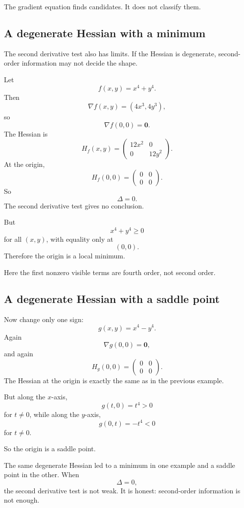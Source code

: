 The gradient equation finds candidates.  It does not classify them.

\subsection{A degenerate Hessian with a minimum}

The second derivative test also has limits.  If the Hessian is degenerate, second-order
information may not decide the shape.

Let
\[
    f(x,y)=x^4+y^4.
\]
Then
\[
    \nabla f(x,y)=(4x^3,4y^3),
\]
so
\[
    \nabla f(0,0)=\mathbf 0.
\]
The Hessian is
\[
    H_f(x,y)
    =
    \begin{pmatrix}
        12x^2 & 0\\
        0 & 12y^2
    \end{pmatrix}.
\]
At the origin,
\[
    H_f(0,0)
    =
    \begin{pmatrix}
        0&0\\
        0&0
    \end{pmatrix}.
\]
So
\[
    \Delta=0.
\]
The second derivative test gives no conclusion.

But
\[
    x^4+y^4\ge0
\]
for all \((x,y)\), with equality only at
\[
    (0,0).
\]
Therefore the origin is a local minimum.

Here the first nonzero visible terms are fourth order, not second order.

\subsection{A degenerate Hessian with a saddle point}

Now change only one sign:
\[
    g(x,y)=x^4-y^4.
\]
Again
\[
    \nabla g(0,0)=\mathbf 0,
\]
and again
\[
    H_g(0,0)
    =
    \begin{pmatrix}
        0&0\\
        0&0
    \end{pmatrix}.
\]
The Hessian at the origin is exactly the same as in the previous example.

But along the \(x\)-axis,
\[
    g(t,0)=t^4>0
\]
for \(t\ne0\), while along the \(y\)-axis,
\[
    g(0,t)=-t^4<0
\]
for \(t\ne0\).

So the origin is a saddle point.

The same degenerate Hessian led to a minimum in one example and a saddle point in
the other.  When
\[
    \Delta=0,
\]
the second derivative test is not weak.  It is honest: second-order information is not
enough.

